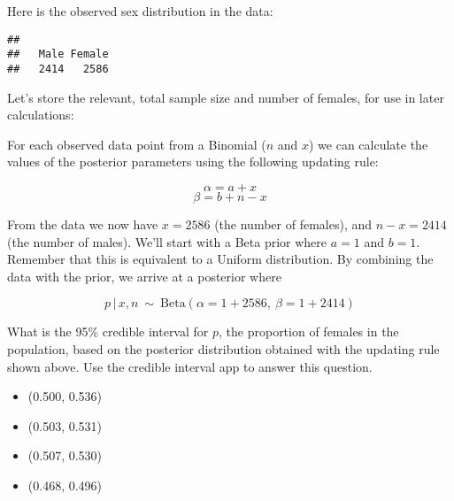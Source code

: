 \documentclass[
]{article}
\newenvironment{Shaded}{\begin{snugshade}}{\end{snugshade}}
\newcommand{\KeywordTok}[1]{\textcolor[rgb]{0.13,0.29,0.53}{\textbf{#1}}}
\newcommand{\NormalTok}[1]{#1}
\newcommand{\OperatorTok}[1]{\textcolor[rgb]{0.81,0.36,0.00}{\textbf{#1}}}
\newcommand{\StringTok}[1]{\textcolor[rgb]{0.31,0.60,0.02}{#1}}
\providecommand{\tightlist}{%
  \setlength{\itemsep}{0pt}\setlength{\parskip}{0pt}}
\begin{document}
Here is the observed sex distribution in the data:

\begin{Shaded}
\end{Shaded}

\begin{verbatim}
## 
##   Male Female 
##   2414   2586
\end{verbatim}

Let's store the relevant, total sample size and number of females, for
use in later calculations:

\begin{Shaded}
\end{Shaded}

For each observed data point from a Binomial (\(n\) and \(x\)) we can
calculate the values of the posterior parameters using the following
updating rule:

\[ \alpha = a + x \] \[ \beta = b + n - x \]

From the data we now have \(x = 2586\) (the number of females), and
\(n - x = 2414\) (the number of males). We'll start with a Beta prior
where \(a = 1\) and \(b = 1\). Remember that this is equivalent to a
Uniform distribution. By combining the data with the prior, we arrive at
a posterior where

\[ p \,|\, x,n ~\sim~ \text{Beta}(\alpha = 1 + 2586,~ \beta = 1 + 2414) \]

What is the 95\% credible interval for \(p\), the proportion of females
in the population, based on the posterior distribution obtained with the
updating rule shown above. Use the credible interval app to answer this
question.

\begin{itemize}
\tightlist
\item
  (0.500, 0.536)
\item
  (0.503, 0.531)
\item
  (0.507, 0.530)
\item
  (0.468, 0.496)
\end{itemize}
\end{document}
